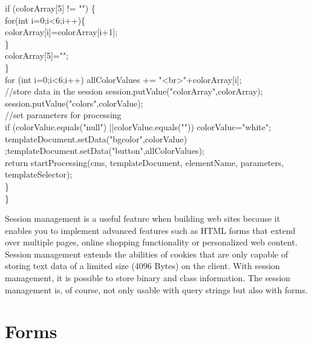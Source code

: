 \begin{java}
\jtabc        if (colorArray[5] != "") \{\\
\jtabd                for(int i=0;i<6;i++)\{\\
\jtabe                        colorArray[i]=colorArray[i+1];\\
\jtabd                \}\\
\jtabd                colorArray[5]="";\\
\jtabc        \}\\
\jtabc        for (int i=0;i<6;i++) allColorValues += "<br>"+colorArray[i];\\
\jtabc        //store data in the session session.putValue("colorArray",colorArray);\\
\jtabd                session.putValue("colors",colorValue);\\
\jtabc        //set parameters for processing\\
\jtabc        if (colorValue.equals("null") ||colorValue.equals("")) colorValue="white";\\
\jtabc        templateDocument.setData("bgcolor",colorValue)
\jtabc        ;templateDocument.setData("button",allColorValues);\\
\jtabc        return startProcessing(cms, templateDocument, elementName,
\jtabc        parameters, templateSelector);\\
\jtabc        \}\\
\}\\
\end{java}

Session management is a useful feature when building web sites
because it enables you to implement advanced features such as
HTML forms that extend over multiple pages, online shopping functionality
or personalized web content. Session management extends the abilities of
cookies that are only capable of storing text data of a limited size
(4096 Bytes) on the client. With session management, it is possible to
store binary and class information. The session management is, of course,
not only usable with query strings but also with forms. 

\section{Forms}

